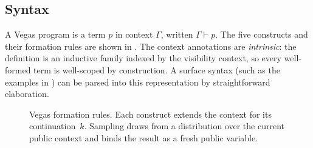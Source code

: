\documentclass[11pt]{article}
\begin{document}
\subsection{Syntax}\label{sec:syntax}

A Vegas program is a term $p$ in context $\Gamma$, written
$\Gamma \vdash p$. The five constructs and their formation rules are shown in
. The context annotations are \emph{intrinsic}: the
definition is an inductive family indexed by the visibility context, so every
well-formed term is well-scoped by construction. A surface syntax (such as the
examples in ) can be parsed into this representation by
straightforward elaboration.

\begin{figure}[ht]
\centering
{}
\caption{Vegas formation rules. Each construct extends the context for its
continuation~$k$. Sampling draws from a distribution over the current public
context and binds the result as a fresh public variable.}\label{fig:grammar}
\end{figure}
\end{document}
